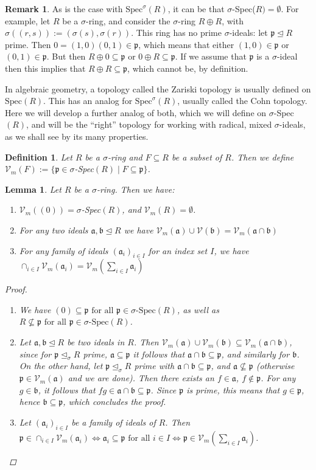 \documentclass{article}
\def\I{\mathbb{I}}
\def\Vm{\mathcal{V}_m}
\def\V{\mathcal{V}}
\def\a{\mathfrak{a}}
\def\b{\mathfrak{b}}
\def\p{\mathfrak{p}}
\def\s{\sigma}
\def\si{\unlhd_{\sigma}}
\def\Spec{\text{Spec}}
\def\sSpec{\sigma\text{-Spec}}
\def\fa{\text{ for all }}
\newenvironment{bew}{\begin{proof}[Proof]}{\end{proof}}
\theoremstyle{plain}
\newtheorem{lem}[Satz]{Lemma}
\newtheorem{defn}[Satz]{Definition}
\theoremstyle{definition}
\newtheorem{rem}[Satz]{Remark}
\begin{document}
\begin{rem}
As is the case with $\Spec^\s(R)$, it can be that $\s$-Spec($R)= \emptyset$. For example, let $R$ be a $\s$-ring, and consider the $\s$-ring $R \oplus R$, with $\s( (r,s)):= (\s(s),\s(r))$. This ring has no prime $\s$-ideals:
let $\p \unlhd R$ prime. Then $0 = (1,0)(0,1) \in \p$, which means that either $(1,0) \in \p$ or $(0,1) \in \p$. But then $R \oplus 0 \subseteq \p$ or $0 \oplus R \subseteq \p$. If we assume that $\p$ is a $\s$-ideal then
 this implies that $R \oplus R \subseteq \p$, which cannot be, by definition.
\end{rem}

In algebraic geometry, a topology called the Zariski topology is usually defined on $\Spec(R)$. This has an analog for $\Spec^\s(R)$, usually called the Cohn topology. Here we will develop a further analog of both,
 which we will define on $\s$-Spec$(R)$, and will be the ``right'' topology for working with radical, mixed $\s$-ideals, as we shall see by its many properties.

\begin{defn}
Let $R$ be a $\s$-ring and $F \subseteq R$ be a subset of $R$. Then we define $\Vm (F):= \{ \p \in \s$-Spec$(R) \mid F \subseteq \p \}$. 
\end{defn}

\begin{lem}\label{topologywelldef}
Let $R$ be a $\s$-ring. Then we have:
\begin{enumerate}
\item $\Vm((0)) = \s$-Spec$(R)$, and $\Vm(R) = \emptyset$.
\item For any two ideals $\a,\b \unlhd R$ we have $\Vm(\a) \cup \V(\b) = \Vm(\a \cap \b)$
\item For any family of ideals $(\a_i)_{i \in I}$ for an index set $I$, we have $\cap_{i \in I} \Vm(\a_i) = \Vm(\sum_{i \in I} \a_i)$
\end{enumerate}
\begin{bew}
\begin{enumerate}
\item We have $(0) \subseteq \p \fa \p \in \sSpec(R)$, as well as $R \not\subseteq \p \fa \p \in \sSpec(R)$.
\item Let $\a, \b \unlhd R$ be two ideals in $R$. Then $\Vm(\a) \cup \Vm(\b) \subseteq \Vm(\a \cap \b)$, since for $\p \si R$ prime, $\a \subseteq \p$ it follows that $\a \cap \b \subseteq \p$, and similarly for $\b$.
On the other hand, let $\p \si R$ prime with $\a \cap \b \subseteq \p$, and $\a \not\subseteq \p$ (otherwise $\p \in \Vm(\a)$ and we are done). Then there exists an $f \in \a$, $f \notin \p$. 
For any $g \in \b$, it follows that $fg \in \a \cap \b \subseteq \p$. Since $\p$ is prime, this means that $g \in \p$, hence $\b \subseteq \p$, which concludes the proof.
\item Let $(\a_i)_{i \in I}$ be a family  of ideals of $R$. Then $\p \in \cap_{i \in I} \Vm(\a_i) \Leftrightarrow \a_i \subseteq \p \fa i \in I \Leftrightarrow \p \in \Vm(\sum_{i \in I} \a_i)$.
\end{enumerate}
\end{bew}
\end{lem}
\end{document}
